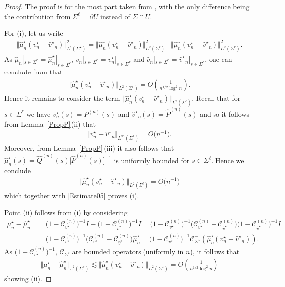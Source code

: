 \documentclass[10pt,a4paper]{amsart}
\newcommand{\Id}{I}
\newcommand{\hQ}{{\widehat Q}}
\newcommand{\smu}{\mu^\star}
\newcommand{\shmu}{\widehat \mu^\star}
\newcommand{\hmu}{{\widehat \mu}}
\newcommand{\bP}{P}
\newcommand{\hP}{{\widehat P}}
\newcommand{\bv}{v}
\newcommand{\hv}{{\widehat v}}
\newcommand{\sbv}{v^\star}
\newcommand{\shv}{{\widehat v^\star}}
\newcommand{\sCau}{\mathcal C_{\Sigma^\star}}
\newcommand{\sCauv}{\mathcal C_{\bv^\star}}
\newcommand{\sCauhv}{\mathcal C_{\hv^\star}}
\newcommand{\Sigl}{\Sigma^\ell}
\newcommand{\Sigr}{\Sigma^r}
\numberwithin{equation}{section}
\begin{document}
\begin{proof}
The proof is for the most part taken from \cite[Proposition~B.2]{CD}, with the only difference being the contribution from $\Sigl =\partial U$ instead of $\Sigma \cap U$.

For (i), let us write
\begin{align}\label{IntDecomp}
 \Vert \shmu_n (\sbv_n - \shv_n) \Vert_{L^2(\Sigma^\star)}^2 = \Vert \shmu_n (\sbv_n - \shv_n) \Vert_{L^2(\Sigl)}^2 + \Vert \shmu_n (\sbv_n - \shv_n) \Vert_{L^2(\Sigr)}^2.
\end{align}
As $\hmu_n|_{s\in \Sigr} = \shmu_n|_{s\in\Sigr}$, $\bv_n|_{s\in \Sigr} = \sbv_n|_{s\in\Sigr}$ and $\hv_n|_{s\in \Sigr} = \shv_n|_{s\in\Sigr}$, one can conclude from \cite[equation~5.1]{CD} that
\begin{align} \label{Estimate05}
 \Vert \shmu_n (\sbv_n - \shv_n) \Vert_{L^2(\Sigr)} = O\left(\frac{1}{n^{1/2}\log^2 n}\right).
\end{align}
Hence it remains to consider the term $\Vert \shmu_n (\sbv_n - \shv_n) \Vert_{L^2(\Sigl)}$. Recall that for $s \in \Sigl$ we have $\sbv_n(s) = \bP^{(n)}(s)$ and $\shv_n(s) = \hP^{(n)}(s)$ and so it follows from Lemma~\ref{PropP}\,(ii) that
\begin{align}\label{jumpsComparison}
 \Vert \sbv_n - \shv_n \Vert_{L^\infty(\Sigl)} = O\big(n^{-1}\big).
\end{align}
Moreover, from Lemma~\ref{PropP}\,(iii) it also follows that $\shmu_n(s) = \hQ^{(n)}(s) \big[\hP^{(n)}(s)\big]^{-1}$ is uniformly bounded for $s \in \Sigl$. Hence we conclude
\begin{align*}
 \Vert \shmu_n (\sbv_n - \shv_n) \Vert_{L^2(\Sigl)} = O\bigl(n^{-1}\bigr)
\end{align*}
which together with \eqref{Estimate05} proves (i).

Point (ii) follows from (i) by considering
\begin{align*}
 \smu_n - \shmu_n &= \big(1-\sCauv^{(n)}\big)^{-1} \Id - \big(1-\sCauhv^{(n)}\big)^{-1}\Id
= \big(1-\sCauv^{(n)}\big)^{-1}\big(\sCauv^{(n)}-\sCauhv^{(n)}\big) \big(1-\sCauhv^{(n)}\big)^{-1}\Id
 \\
 &= \big(1-\sCauv^{(n)}\big)^{-1}\big(\sCauv^{(n)}-\sCauhv^{(n)}\big)\shmu_n= \big(1-\sCauv^{(n)}\big)^{-1}\sCau^-(\shmu_n(\sbv_n-\shv_n)).
\end{align*}
As $\big(1-\sCauv^{(n)}\big)^{-1}$, $\sCau^-$ are bounded operators (uniformly in $n$), it follows that{\samepage
\begin{align*}
 \Vert \smu_n - \shmu_n \Vert_{L^2(\Sigma^\star)} \lesssim \Vert \shmu_n(\sbv_n-\shv_n) \Vert_{L^2(\Sigma^\star)} = O\left(\frac{1}{n^{1/2}\log^2 n}\right)
\end{align*}
showing (ii).}


\end{proof}
\end{document}
